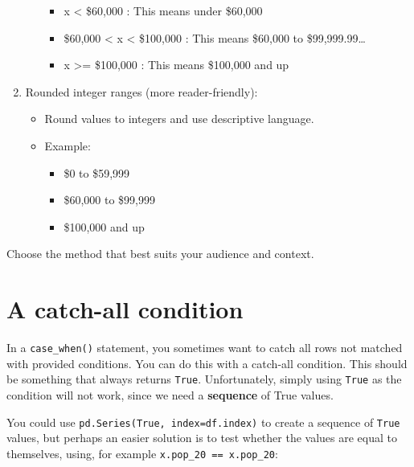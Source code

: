 \documentclass[
  letterpaper,
  DIV=11,
  numbers=noendperiod]{scrreprt}
\providecommand{\tightlist}{%
  \setlength{\itemsep}{0pt}\setlength{\parskip}{0pt}}\usepackage{longtable,booktabs,array}
\begin{document}
\begin{tcolorbox}
\begin{enumerate}
\begin{itemize}
    \begin{itemize}
    \tightlist
    \item
      x \textless{} \$60,000 : This means under \$60,000
    \item
      \$60,000 \textless{} x \textless{} \$100,000 : This means \$60,000
      to \$99,999.99\ldots{}
    \item
      x \textgreater= \$100,000 : This means \$100,000 and up
    \end{itemize}
  \end{itemize}
\item
  Rounded integer ranges (more reader-friendly):

  \begin{itemize}
  \tightlist
  \item
    Round values to integers and use descriptive language.
  \item
    Example:

    \begin{itemize}
    \tightlist
    \item
      \$0 to \$59,999
    \item
      \$60,000 to \$99,999
    \item
      \$100,000 and up
    \end{itemize}
  \end{itemize}
\end{enumerate}

Choose the method that best suits your audience and context.

\end{tcolorbox}

\section{A catch-all condition}\label{a-catch-all-condition}

In a \texttt{case\_when()} statement, you sometimes want to catch all
rows not matched with provided conditions. You can do this with a
catch-all condition. This should be something that always returns
\texttt{True}. Unfortunately, simply using \texttt{True} as the
condition will not work, since we need a \textbf{sequence} of True
values.

You could use \texttt{pd.Series(True,\ index=df.index)} to create a
sequence of \texttt{True} values, but perhaps an easier solution is to
test whether the values are equal to themselves, using, for example
\texttt{x.pop\_20\ ==\ x.pop\_20}:
\end{document}
